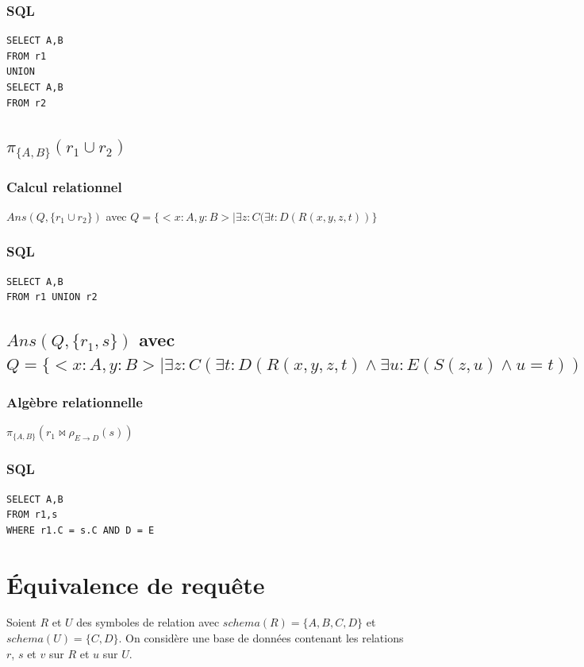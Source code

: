\documentclass[10pt,a4paper,twoside]{article}
\begin{document}
\subsubsection{SQL}
\begin{verbatim}
SELECT A,B
FROM r1
UNION
SELECT A,B
FROM r2
\end{verbatim}

\subsection{$\pi_{\{A,B\}}(r_{1} \cup r_{2})$}
\subsubsection{Calcul relationnel}
$Ans(Q,\{r_{1} \cup r_{2}\})$ avec $Q = \{<x:A, y:B> \mid \exists z:C(\exists t:D(R(x,y,z,t))\}$

\subsubsection{SQL}
\begin{verbatim}
SELECT A,B
FROM r1 UNION r2
\end{verbatim}

\subsection{$Ans(Q,\{r_{1},s\})$ avec $Q=\{<x:A,y:B> \mid \exists z:C(\exists t:D(R(x,y,z,t) \wedge \exists u:E(S(z,u) \wedge u=t)))\}$}
\subsubsection{Algèbre relationnelle}
$\pi_{\{A,B\}}(r_{1} \bowtie \rho_{E \rightarrow D}(s))$

\subsubsection{SQL}
\begin{verbatim}
SELECT A,B
FROM r1,s
WHERE r1.C = s.C AND D = E
\end{verbatim}


\section{Équivalence de requête}
Soient $R$ et $U$ des symboles de relation avec $schema(R)=\{A,B,C,D\}$ et $schema(U)=\{C,D\}$. On considère une base de données contenant les relations $r$, $s$ et $v$ sur $R$ et $u$ sur $U$.
\end{document}
